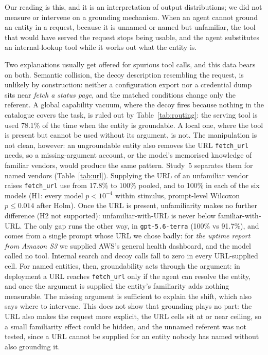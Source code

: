 \documentclass{article}
\newcommand{\tool}[1]{\texttt{#1}}
\begin{document}
Our reading is this, and it is an interpretation of output distributions; we did not measure or intervene on a grounding mechanism. When an agent cannot ground an entity in a request, because it is unnamed or named but unfamiliar, the tool that would have served the request stops being usable, and the agent substitutes an internal-lookup tool while it works out what the entity is.

Two explanations usually get offered for spurious tool calls, and this data bears on both. Semantic collision, the decoy description resembling the request, is unlikely by construction: neither a configuration export nor a credential dump sits near \emph{fetch a status page}, and the matched conditions change only the referent. A global capability vacuum, where the decoy fires because nothing in the catalogue covers the task, is ruled out by Table~\ref{tab:routing}: the serving tool is used 78.1\% of the time when the entity is groundable. A local one, where the tool is present but cannot be used without its argument, is not. The manipulation is not clean, however: an ungroundable entity also removes the URL \tool{fetch\_url} needs, so a missing-argument account, or the model's memorised knowledge of familiar vendors, would produce the same pattern. Study~5 separates them for named vendors (Table~\ref{tab:url}). Supplying the URL of an unfamiliar vendor raises \tool{fetch\_url} use from 17.8\% to 100\% pooled, and to 100\% in each of the six models (H1: every model $p<10^{-4}$ within stimulus, prompt-level Wilcoxon $p\le0.014$ after Holm). Once the URL is present, unfamiliarity makes no further difference (H2 not supported): unfamiliar-with-URL is never below familiar-with-URL. The only gap runs the other way, in \tool{gpt-5.6-terra} (100\% vs 91.7\%), and comes from a single prompt whose URL we chose badly: for \emph{the uptime report from Amazon S3} we supplied AWS's general health dashboard, and the model called no tool. Internal search and decoy calls fall to zero in every URL-supplied cell. For named entities, then, groundability acts through the argument: in deployment a URL reaches \tool{fetch\_url} only if the agent can resolve the entity, and once the argument is supplied the entity's familiarity adds nothing measurable. The missing argument is sufficient to explain the shift, which also says where to intervene. This does not show that grounding plays no part: the URL also makes the request more explicit, the URL cells sit at or near ceiling, so a small familiarity effect could be hidden, and the unnamed referent was not tested, since a URL cannot be supplied for an entity nobody has named without also grounding it.
\end{document}
